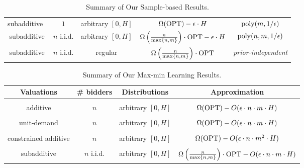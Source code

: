 \begin{table}[h]
\begin{tabular}{c || c | c| c| c}
			subadditive~\cite{MorgensternR16} & $1$ & arbitrary $[0,H]$  &  $\Omega(\text{OPT})-\epsilon\cdot H$ &${\rm poly}(m,1/\epsilon)$\\
						subadditive & $n$ i.i.d. & arbitrary $[0,H]$  &  $\Omega\left(\frac{n}{\max\{n,m\}}\right)\cdot \text{OPT}-\epsilon\cdot H$ &${\rm poly}(n,m,1/\epsilon)$\\
						subadditive & $n$ i.i.d. & regular & $\Omega\left(\frac{n}{\max\{n,m\}}\right)\cdot \text{OPT}$ & \emph{prior-independent}\\
\hline
		\end{tabular}
		
	\caption{Summary of Our Sample-based Results.}
	\label{tab:sample-based results}
\end{table}

\begin{table}[h]
	\centering
		\begin{tabular}{c || c | c| c}
			
			\hline\hline
			Valuations & \# bidders &   Distributions  & Approximation \\
						\hline
												&&&\\
			  additive &  $n$  & arbitrary $[0,H]$ & $\Omega(\text{OPT})-O(\epsilon\cdot n\cdot m\cdot H)$ 	\\					\hline
						&&&\\

			unit-demand&  $n$ & arbitrary $[0,H]$ & $\Omega(\text{OPT})-O(\epsilon\cdot n\cdot m\cdot H)$  \\
				\hline
										&&&\\

			constrained additive &  $n$ &	 arbitrary $[0,H]$ & $\Omega(\text{OPT})-O(\epsilon\cdot n\cdot m^2\cdot H)$\\

			\hline
										&&&\\


						subadditive & $n$ i.i.d. & arbitrary $[0,H]$  & $\Omega\left(\frac{n}{\max\{n,m\}}\right)\cdot \text{OPT}-O(\epsilon\cdot n \cdot m\cdot H)$\\
\hline
		\end{tabular}

	\caption{Summary of Our Max-min Learning Results.}
	\label{tab:max-min learning results}
\end{table}